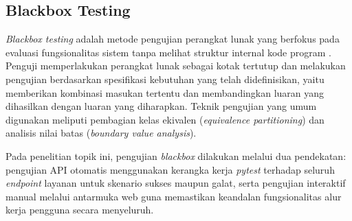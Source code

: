 \subsection{Blackbox Testing}
\textit{Blackbox testing} adalah metode pengujian perangkat lunak yang berfokus pada evaluasi fungsionalitas sistem tanpa melihat struktur internal kode program \cite{3}. Penguji memperlakukan perangkat lunak sebagai kotak tertutup dan melakukan pengujian berdasarkan spesifikasi kebutuhan yang telah didefinisikan, yaitu memberikan kombinasi masukan tertentu dan membandingkan luaran yang dihasilkan dengan luaran yang diharapkan. Teknik pengujian yang umum digunakan meliputi pembagian kelas ekivalen (\textit{equivalence partitioning}) dan analisis nilai batas (\textit{boundary value analysis}).

Pada penelitian topik ini, pengujian \textit{blackbox} dilakukan melalui dua pendekatan: pengujian API otomatis menggunakan kerangka kerja \textit{pytest} terhadap seluruh \textit{endpoint} layanan untuk skenario sukses maupun galat, serta pengujian interaktif manual melalui antarmuka web guna memastikan keandalan fungsionalitas alur kerja pengguna secara menyeluruh.
